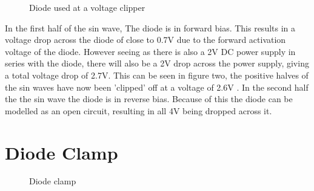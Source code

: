 \documentclass[a4paper,11pt]{article}
\begin{document}
\begin{figure}[t]
\centering
{}
\caption{Diode used at a voltage clipper}
\end{figure}
In the first half of the sin wave, The diode is in forward bias. This results in a voltage drop across the diode of close to 0.7V  due to the forward activation voltage of the diode. However seeing as there is also a 2V DC power supply in series with the diode, there will also be a 2V drop across the power supply, giving a total voltage drop of 2.7V. This can be seen in figure two, the positive halves of the sin waves have now been 'clipped' off at a voltage of 2.6V . In the second half the the sin wave the diode is in reverse bias. Because of this the diode can be modelled  as an open circuit, resulting in all 4V being dropped across it.
\newpage

\section{Diode Clamp}
\begin{figure}[h]
\centering
{}
\caption{Diode clamp}
\end{figure}
\end{document}
